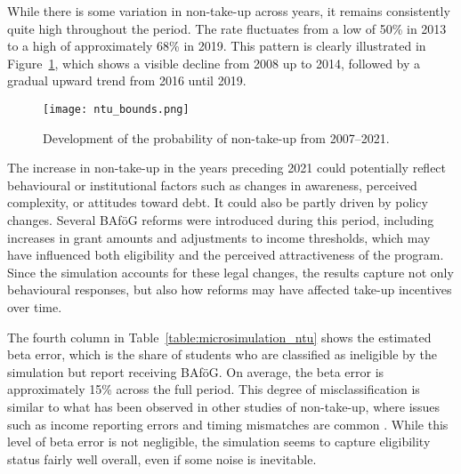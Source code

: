 


While there is some variation in non-take-up across years, it remains consistently quite high throughout the period. 
The rate fluctuates from a low of 50\% in 2013 to a high of approximately 68\% in 2019. 
This pattern is clearly illustrated in Figure~\ref{fig:ntu_bounds_over_years}, which shows a visible decline from 2008 up to 2014, followed by a gradual upward trend from 2016 until 2019. 

\begin{figure}[htbp]
  \centering
  \texttt{[image: ntu\_bounds.png]}
  \caption{Development of the probability of non-take-up from 2007--2021.}
  \label{fig:ntu_bounds_over_years}
\end{figure}

The increase in non-take-up in the years preceding 2021 could potentially reflect behavioural or institutional factors such as changes in awareness, perceived complexity, or attitudes toward debt. 
It could also be partly driven by policy changes. 
Several BAföG reforms were introduced during this period, including increases in grant amounts and adjustments to income thresholds, which may have influenced both eligibility and the perceived attractiveness of the program. 
Since the simulation accounts for these legal changes, the results capture not only behavioural responses, but also how reforms may have affected take-up incentives over time.


The fourth column in Table~\ref{table:microsimulation_ntu} shows the estimated beta error, which is the share of students who are classified as ineligible by the simulation but report receiving BAföG. 
On average, the beta error is approximately 15\% across the full period. 
This degree of misclassification is similar to what has been observed in other studies of non-take-up, where issues such as income reporting errors and timing mismatches are common \citep{frick_claim_2007}.
While this level of beta error is not negligible, the simulation seems to capture eligibility status fairly well overall, even if some noise is inevitable.

